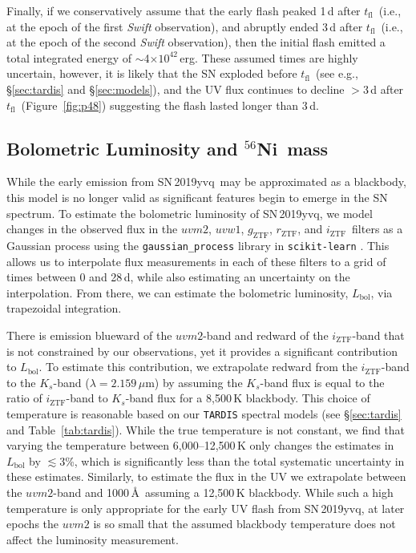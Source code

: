 \documentclass[twocolumn]{aastex63}
\newcommand{\rztf}{$r_\mathrm{ZTF}$}
\newcommand{\gztf}{$g_\mathrm{ZTF}$}
\newcommand{\iztf}{$i_\mathrm{ZTF}$}
\newcommand{\tfl}{$t_\mathrm{fl}$}
\newcommand{\radni}{$^{56}$Ni}
\newcommand{\sn}{SN\,2019yvq}
\begin{document}
Finally, if we conservatively assume that the early flash peaked 1\,d after
\tfl\ (i.e., at the epoch of the first \textit{Swift} observation), and
abruptly ended 3\,d after \tfl\ (i.e., at the epoch of the second
\textit{Swift} observation), then the initial flash emitted a total integrated
energy of $\sim$4$\times 10^{42}$\,erg.
These assumed times are highly uncertain, however, it is likely that the SN
exploded before \tfl\ (see e.g., \S\ref{sec:tardis} and \S\ref{sec:models}),
and the UV flux continues to decline $>$3\,d after \tfl\
(Figure~\ref{fig:p48}) suggesting the flash lasted longer than 3\,d.

\subsection{Bolometric Luminosity and \radni\ mass}\label{sec:ni_mass}

While the early emission from \sn\ may be approximated as a blackbody, this
model is no longer valid as significant features begin to emerge in the SN
spectrum. To estimate the bolometric luminosity of \sn, we model changes in
the observed flux in the $uvm2$, $uvw1$, \gztf, \rztf, and \iztf\ filters as a
Gaussian process \citep{Rasmussen06} using the \texttt{gaussian\_process}
library in \texttt{scikit-learn} \citep{Pedregosa11}. This allows us to
interpolate flux measurements in each of these filters to a grid of times
between 0 and 28\,d, while also estimating an uncertainty on the
interpolation. From there, we can estimate the bolometric luminosity,
$L_\mathrm{bol}$, via trapezoidal integration.

There is emission blueward of the $uvm2$-band and redward of the \iztf-band
that is not constrained by our observations, yet it provides a significant
contribution to $L_\mathrm{bol}$. To estimate this contribution, we
extrapolate redward from the \iztf-band to the $K_s$-band ($\lambda =
2.159\,\mu$m) by assuming the $K_s$-band flux is equal to the ratio of
\iztf-band to $K_s$-band flux for a 8,500\,K blackbody. This choice of
temperature is reasonable based on our \texttt{TARDIS} spectral models (see
\S\ref{sec:tardis} and Table~\ref{tab:tardis}). While the true temperature is
not constant, we find that varying the temperature between 6,000--12,500\,K
only changes the estimates in $L_\mathrm{bol}$ by $\lesssim 3$\%, which is
significantly less than the total systematic uncertainty in these estimates.
Similarly, to estimate the flux in the UV we extrapolate between the
$uvm2$-band and 1000\,\AA\ assuming a 12,500\,K blackbody. While such a high
temperature is only appropriate for the early UV flash from \sn, at later
epochs the $uvm2$ is so small that the assumed blackbody temperature does not
affect the luminosity measurement.
\end{document}
